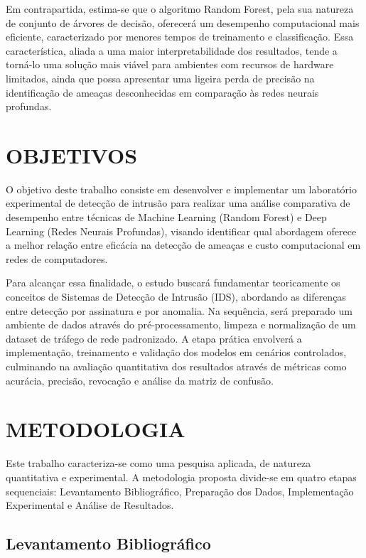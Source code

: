 \documentclass[12pt,oneside]{abntex2}
\begin{document}
Em contrapartida, estima-se que o algoritmo Random Forest, pela sua natureza de conjunto de árvores de decisão, oferecerá um desempenho computacional mais eficiente, caracterizado por menores tempos de treinamento e classificação. Essa característica, aliada a uma maior interpretabilidade dos resultados, tende a torná-lo uma solução mais viável para ambientes com recursos de hardware limitados, ainda que possa apresentar uma ligeira perda de precisão na identificação de ameaças desconhecidas em comparação às redes neurais profundas.

\section{OBJETIVOS}

O objetivo deste trabalho consiste em desenvolver e implementar um laboratório experimental de detecção de intrusão para realizar uma análise comparativa de desempenho entre técnicas de Machine Learning (Random Forest) e Deep Learning (Redes Neurais Profundas), visando identificar qual abordagem oferece a melhor relação entre eficácia na detecção de ameaças e custo computacional em redes de computadores.

Para alcançar essa finalidade, o estudo buscará fundamentar teoricamente os conceitos de Sistemas de Detecção de Intrusão (IDS), abordando as diferenças entre detecção por assinatura e por anomalia. Na sequência, será preparado um ambiente de dados através do pré-processamento, limpeza e normalização de um dataset de tráfego de rede padronizado. A etapa prática envolverá a implementação, treinamento e validação dos modelos em cenários controlados, culminando na avaliação quantitativa dos resultados através de métricas como acurácia, precisão, revocação e análise da matriz de confusão.

\section{METODOLOGIA}

Este trabalho caracteriza-se como uma pesquisa aplicada, de natureza quantitativa e experimental. A metodologia proposta divide-se em quatro etapas sequenciais: Levantamento Bibliográfico, Preparação dos Dados, Implementação Experimental e Análise de Resultados.

\subsection{Levantamento Bibliográfico}
\end{document}

